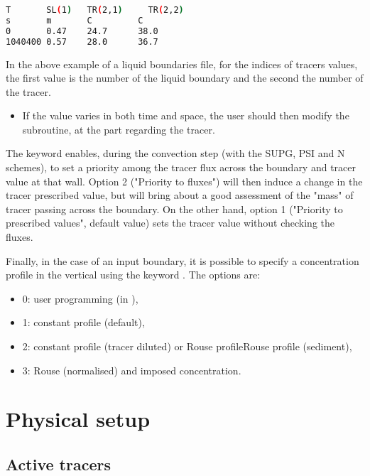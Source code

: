 \begin{lstlisting}[language=bash]
T       SL(1)   TR(2,1)     TR(2,2)
s       m       C         C
0       0.47    24.7      38.0
1040400 0.57    28.0      36.7
\end{lstlisting}

In the above example of a liquid boundaries file, for the indices of tracers
values, the first value is the number of the liquid boundary and the second the
number of the tracer.

\begin{itemize}
\item  If the value varies in both time and space, the user should then modify
the  subroutine, at the part regarding the tracer.
\end{itemize}

The keyword  enables, during the
convection step (with the SUPG, PSI and N schemes), to set a priority among the
tracer flux across the boundary and tracer value at that wall. Option 2
("Priority to fluxes") will then induce a change in the tracer prescribed
value, but will bring about a good assessment of the "mass" of tracer passing
across the boundary. On the other hand, option 1 ("Priority to prescribed
values", default value) sets the tracer value without checking the fluxes.

Finally, in the case of an input boundary, it is possible to specify a
concentration profile in the vertical using the keyword . The options are:

\begin{itemize}
\item  0: user programming (in ),

\item  1: constant profile (default),

\item  2: constant profile (tracer diluted) or Rouse profileRouse profile
(sediment),

\item  3: Rouse (normalised) and imposed concentration.
\end{itemize}

\section{Physical setup}

\subsection{Active tracers}

